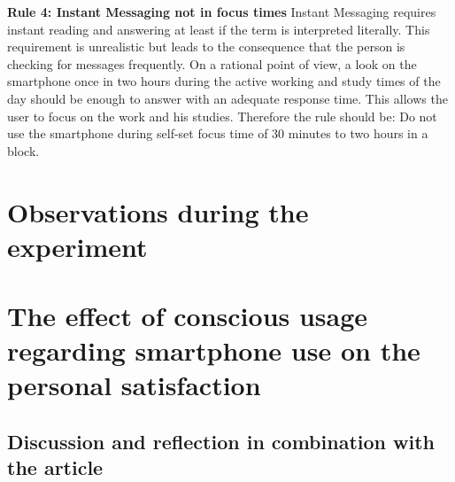 \documentclass[11pt,letterpaper]{article}
\begin{document}
\textbf{Rule 4: Instant Messaging not in focus times}
Instant Messaging requires instant reading and answering at least if the term is interpreted literally. This requirement is unrealistic but leads to the consequence that the person is checking for messages frequently. On a rational point of view, a look on the smartphone once in two hours during the active working and study times of the day should be enough to answer with an adequate response time. This allows the user to focus on the work and his studies. Therefore the rule should be: Do not use the smartphone during self-set focus time of 30 minutes to two hours in a block. \newline

\section*{Observations during the experiment}

\section*{The effect of conscious usage regarding smartphone use on the personal satisfaction}

\subsection*{Discussion and reflection in combination with the article}

\newpage





\printbibliography 
\end{document}
